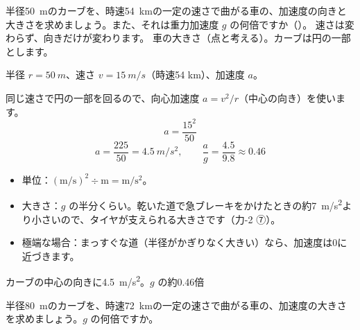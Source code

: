 \begin{phreidai}[カーブを曲がる車の加速度]
\label{ph:力-1:ex8}半径\qty{50}{m}のカーブを、時速\qty{54}{km}の一定の速さで曲がる車の、加速度の向きと大きさを求めましょう。また、それは重力加速度 $g$ の何倍ですか（\bkhatenaref）。
\phbamen
速さは変わらず、向きだけが変わります。
\phmushi
車の大きさ（点と考える）。カーブは円の一部とします。
\phzu
\noindent\begin{minipage}[c]{0.4\linewidth}\centering
{}
\end{minipage}\hfill
\begin{minipage}[c]{0.57\linewidth}
半径 $r=\qty{50}{m}$、速さ $v=\qty{15}{m/s}$（時速54 km）、加速度 $a$。
\end{minipage}
\phriyu
同じ速さで円の一部を回るので、向心加速度 $a=v^2/r$（中心の向き）を使います。
\phtateru
\[ a=\frac{15^2}{50} \]
\phtoku
\[ a=\frac{225}{50}=\qty{4.5}{m/s^2},\qquad \frac{a}{g}=\frac{4.5}{9.8}\approx0.46 \]
\phtashikame
\begin{itemize}[leftmargin=1.2\zw, itemsep=1pt, topsep=1pt, label={\color{bkTheme}●}]
\item 単位：$(\mathrm{m/s})^2\div\mathrm m=\mathrm{m/s^2}$。
\item 大きさ：$g$ の半分くらい。乾いた道で急ブレーキをかけたときの約\qty{7}{m/s^2}より小さいので、タイヤが支えられる大きさです（力-2 ⑦）。
\item 極端な場合：まっすぐな道（半径がかぎりなく大きい）なら、加速度は0に近づきます。
\end{itemize}
\kotae カーブの中心の向きに\qty{4.5}{m/s^2}。$g$ の約0.46倍
\end{phreidai}
\begin{jibun}
半径\qty{80}{m}のカーブを、時速\qty{72}{km}の一定の速さで曲がる車の、加速度の大きさを求めましょう。$g$ の何倍ですか。
\end{jibun}

